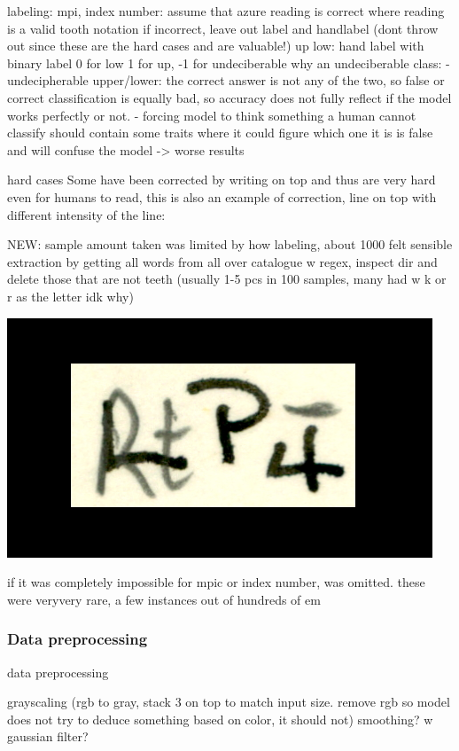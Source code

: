 \documentclass{article}
\begin{document}
labeling:
mpi, index number: assume that azure reading is correct where reading is a valid tooth notation
if incorrect, leave out label and handlabel (dont throw out since these are the hard cases and are valuable!)
up low: hand label with binary label 0 for low 1 for up, -1 for undeciberable
    why an undeciberable class:
    - undecipherable upper/lower: the correct answer is not any of the two, so false or correct classification is equally bad, so accuracy does not fully reflect if the model works perfectly or not.
    - forcing model to think something a human cannot classify should contain some traits where it could figure which one it is is false and will confuse the model -> worse results

hard cases
Some have been corrected by writing on top and thus are very hard 
even for humans to read, this is also an example of correction, line on top with different
intensity of the line: 

NEW:
sample amount taken was limited by how labeling, about 1000 felt sensible
extraction by getting all words from all over catalogue w regex, inspect dir 
and delete those that are not teeth (usually 1-5 pcs in 100 samples, many had w k or r as the letter idk why)

\includegraphics*[scale=0.2]{../images/superambiguous_data_sample.png}

if it was completely impossible for mpic or index number, was omitted. these were veryvery rare, a few instances out of hundreds of em

\subsubsection{Data preprocessing}

data preprocessing

grayscaling (rgb to gray, stack 3 on top to match input size. remove rgb so model does not try to deduce something based on color, it should not)
smoothing? w gaussian filter?
\end{document}
